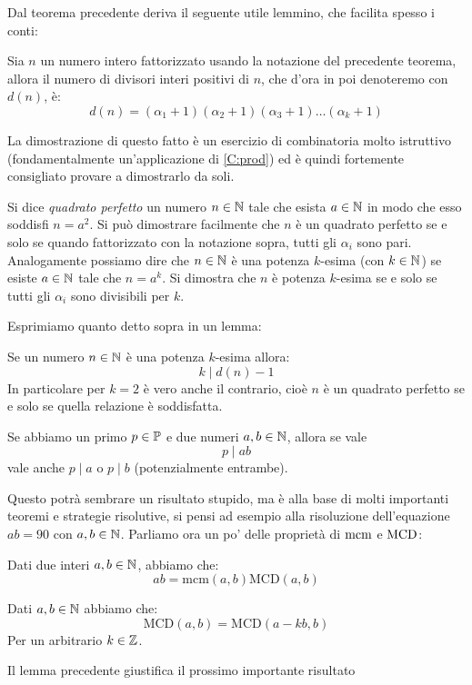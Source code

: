 \documentclass[11pt]{scrartcl}
\begin{document}
	Dal teorema precedente deriva il seguente utile lemmino, che facilita spesso i conti:
	
	\begin{lemma}
		Sia $n$ un numero intero fattorizzato usando la notazione del precedente teorema, allora il numero di divisori interi positivi di $n$, che d'ora in poi denoteremo con $d(n)$, è:
		$$d(n)=(\alpha_1+1)(\alpha_2+1)(\alpha_3+1)\dots(\alpha_k+1)$$
	\end{lemma}
	
	La dimostrazione di questo fatto è un esercizio di combinatoria molto istruttivo (fondamentalmente un'applicazione di \ref{C:prod}) ed è quindi fortemente consigliato provare a dimostrarlo da soli.
	
	\begin{definition}
		Si dice \textit{quadrato perfetto} un numero $n\in\mathbb N$ tale che esista $a\in\mathbb N$ in modo che esso soddisfi $n=a^2$.
		Si può dimostrare facilmente che $n$ è un quadrato perfetto se e solo se quando fattorizzato con la notazione sopra, tutti gli $\alpha_i$ sono pari. \\ 
		Analogamente possiamo dire che $n\in\mathbb N$ è una potenza $k$-esima (con $k\in\mathbb N$) se esiste $a\in\mathbb N$ tale che $n=a^k$. Si dimostra che $n$ è potenza $k$-esima se e solo se tutti gli $\alpha_i$ sono divisibili per $k$.
	\end{definition}
	Esprimiamo quanto detto sopra in un lemma:
	\begin{lemma}
		Se un numero $n\in\mathbb N$ è una potenza $k$-esima allora:
		$$k \mid d(n)-1$$
		In particolare per $k=2$ è vero anche il contrario, cioè $n$ è un quadrato perfetto se e solo se quella relazione è soddisfatta.
	\end{lemma}
	
	\begin{lemma}[Euclide]
		Se abbiamo un primo $p\in\mathbb P$ e due numeri $a,b\in\mathbb N$, allora se vale 
		$$p\mid ab$$ 
		vale anche $p\mid a$ o $p \mid b$ (potenzialmente entrambe).
	\end{lemma}
	Questo potrà sembrare un risultato stupido, ma è alla base di molti importanti teoremi e strategie risolutive, si pensi ad esempio alla risoluzione dell'equazione $ab=90$ con $a,b\in\mathbb N$.
	Parliamo ora un po' delle proprietà di $\text{mcm}$ e $\text{MCD}$:
	\begin{lemma}
		Dati due interi $a,b \in \mathbb N$, abbiamo che:
		$$ab=\text{mcm}(a,b)\text{MCD}(a,b)$$
	\end{lemma}
	\begin{lemma}
		Dati $a,b \in \mathbb N$ abbiamo che:
		$$\text{MCD}(a,b)=\text{MCD}(a-kb,b)$$
		Per un arbitrario $k\in \mathbb Z$. 
	\end{lemma}
	\newpage
	Il lemma precedente giustifica il prossimo importante risultato
	
\end{document}
